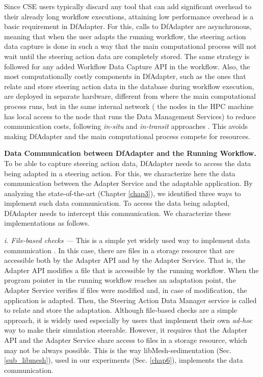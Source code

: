 Since CSE users typically discard any tool that can add significant overhead to their already long workflow executions, attaining low performance overhead is a basic requirement in DfAdapter.
For this, calls to DfAdapter are asynchronous,
meaning that when the user adapts the running workflow, the steering action data capture is done in such a way that the main computational
process will not wait until the steering action data are completely stored.
The same strategy is
followed for any added Workflow Data Capture API in the workflow. Also,
the most computationally costly components in DfAdapter, such as the
ones that relate and store steering action data in the database during workflow
execution, are deployed in separate hardware, different from where the
main computational process runs, but in the same internal network
(\eg{} the nodes in the HPC machine has local access to the node that
runs the Data Management Services) to reduce communication costs,
following \textit{in-situ} and \textit{in-transit} approaches
\cite{Bauer2016In}.
This avoids making DfAdapter and the main computational process compete
for resources.


\textbf{Data Communication between DfAdapter
and the Running Workflow.}
\label{data_comm_impl}
To be able to capture steering action data, DfAdapter needs to
access the data being adapted in a steering action.
For this, we characterize here the data communication between the Adapter Service and the adaptable application.
By analyzing the state-of-the-art (Chapter \ref{chap3}), we identified three ways to implement such data communication.
To access the data being adapted, DfAdapter needs to intercept this communication. We characterize these
implementations as follows.

\emph{i. File-based checks ---} This is a simple yet widely used way to
implement data communication \cite{Bauer2016In}.
In this case, there are files in a storage resource that are accessible
both by the Adapter API and by the Adapter Service.
That is, the Adapter API modifies a file that is accessible by the running workflow.
When the program pointer in the running workflow reaches an adaptation point,
the Adapter Service verifies if files
were modified and, in case of modification, the application is adapted.
Then, the Steering Action Data Manager service is called to relate and store the adaptation.
Although
file-based checks are a simple approach, it is widely used especially by
users that implement their own \emph{ad-hoc} way to make their
simulation steerable.
However, it requires that the Adapter API and the Adapter Service share access to files in a storage resource, which
may not be always possible. This is the way libMesh-sedimentation (Sec. \ref{sub_libmesh}), used in our experiments (Sec. \ref{chap6}), implements the data communication.

